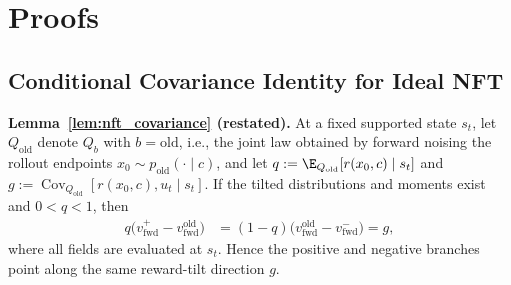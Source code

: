 \documentclass{article}
\begin{document}
\FloatBarrier
\endgroup
\section{Proofs}
\label{app:proofs}

\subsection{Conditional Covariance Identity for Ideal NFT}
\label{app:nft_covariance_proof}

\noindent\textbf{Lemma~\ref{lem:nft_covariance} (restated).}
At a fixed supported state $s_t$, let $Q_{\mathrm{old}}$ denote $Q_b$ with $b=\mathrm{old}$, i.e., the joint law obtained by forward noising the rollout endpoints $x_0\sim p_{\mathrm{old}}(\cdot\mid c)$, and let
$q:=\E_{Q_{\mathrm{old}}}[r(x_0,c)\mid s_t]$ and
$g:=\operatorname{Cov}_{Q_{\mathrm{old}}}
[r(x_0,c),\allowbreak u_t\mid s_t]$. If the tilted distributions and moments exist
and $0<q<1$, then
\begin{align*}
q\bigl(v_{\mathrm{fwd}}^+-v_{\mathrm{fwd}}^{\mathrm{old}}\bigr)
&=(1-q)\bigl(v_{\mathrm{fwd}}^{\mathrm{old}}
-v_{\mathrm{fwd}}^-\bigr)=g,
\end{align*}
where all fields are evaluated at $s_t$. Hence the positive and negative
branches point along the same reward-tilt direction $g$.
\end{document}
